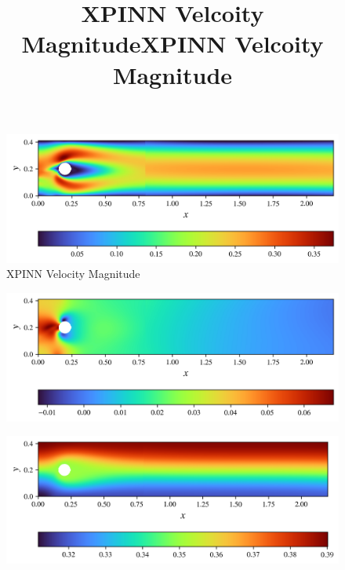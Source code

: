 \begin{figure}[h]
    \centering
    \includegraphics[width=\linewidth]{Project1XPINNs/figures/NavierStokes/TwoBoxDecomp/TB_10000_iter_right_emphasis/solution/flow_magnitude_two_box.png}
    \caption{XPINN Velocity Magnitude}
    \label{fig:NS_XPINN_flow_mag}
\end{figure}

\begin{figure}[h]
    \centering
    \includegraphics[width=\linewidth]{Project1XPINNs/figures/NavierStokes/TwoBoxDecomp/TB_10000_iter_right_emphasis/solution/pressure_two_box.png}
    \title{XPINN Velcoity Magnitude}
    \label{fig:NS_XPINN_pressure}
\end{figure}

\begin{figure}[h]
    \centering
    \includegraphics[width=\linewidth]{Project1XPINNs/figures/NavierStokes/TwoBoxDecomp/TB_10000_iter_right_emphasis/solution/streamfunc_two_box.png}
    \title{XPINN Velcoity Magnitude}
    \label{fig:NS_XPINN_flow_mag}
\end{figure}





